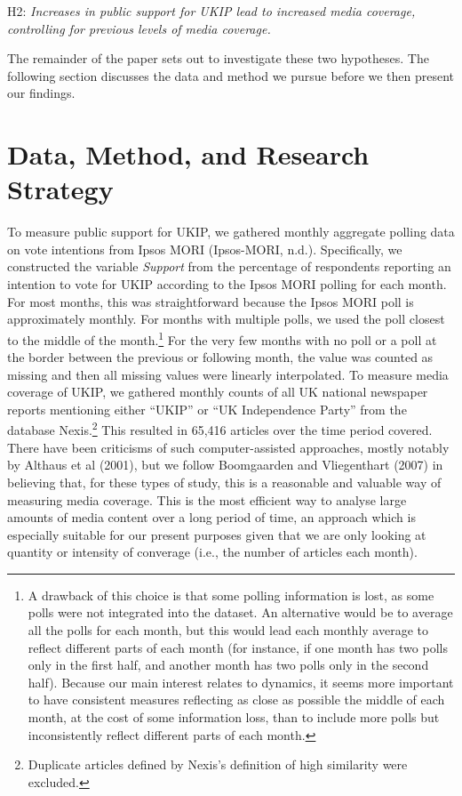 \documentclass[12pt,article]{article}
\let\rmarkdownfootnote\footnote%
\def\footnote{\protect\rmarkdownfootnote}
\begin{document}
H2: \emph{Increases in public support for UKIP lead to increased media
coverage, controlling for previous levels of media coverage.}

The remainder of the paper sets out to investigate these two hypotheses.
The following section discusses the data and method we pursue before we
then present our findings.

\section{Data, Method, and Research
Strategy}\label{data-method-and-research-strategy}

To measure public support for UKIP, we gathered monthly aggregate
polling data on vote intentions from Ipsos MORI (Ipsos-MORI, n.d.).
Specifically, we constructed the variable \emph{Support} from the
percentage of respondents reporting an intention to vote for UKIP
according to the Ipsos MORI polling for each month. For most months,
this was straightforward because the Ipsos MORI poll is approximately
monthly. For months with multiple polls, we used the poll closest to the
middle of the
month.\footnote{A drawback of this choice is that some polling information is lost, as some polls were not integrated into the dataset. An alternative would be to average all the polls for each month, but this would lead each monthly average to reflect different parts of each month (for instance, if one month has two polls only in the first half, and another month has two polls only in the second half). Because our main interest relates to dynamics, it seems more important to have consistent measures reflecting as close as possible the middle of each month, at the cost of some information loss, than to include more polls but inconsistently reflect different parts of each month.}
For the very few months with no poll or a poll at the border between the
previous or following month, the value was counted as missing and then
all missing values were linearly interpolated. To measure media coverage
of UKIP, we gathered monthly counts of all UK national newspaper reports
mentioning either ``UKIP'' or ``UK Independence Party'' from the
database
Nexis.\footnote{Duplicate articles defined by Nexis's definition of high similarity were excluded.}
This resulted in 65,416 articles over the time period covered. There
have been criticisms of such computer-assisted approaches, mostly
notably by Althaus et al (2001), but we follow Boomgaarden and
Vliegenthart (2007) in believing that, for these types of study, this is
a reasonable and valuable way of measuring media coverage. This is the
most efficient way to analyse large amounts of media content over a long
period of time, an approach which is especially suitable for our present
purposes given that we are only looking at quantity or intensity of
converage (i.e., the number of articles each month).
\end{document}
